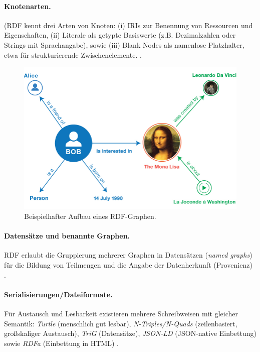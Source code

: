 \paragraph{Knotenarten.} (RDF kennt drei Arten von Knoten: (i) IRIs zur Benennung von Ressourcen und Eigenschaften, (ii) Literale als getypte Basiswerte (z.B. Dezimalzahlen oder Strings mit Sprachangabe), sowie (iii) Blank Nodes als namenlose Platzhalter, etwa für strukturierende Zwischenelemente. \cite{RDF11Primer}.

\begin{figure}[h]
\centering
\includegraphics[width=\linewidth]{Abbildungen/example-graph.jpg}
\caption{Beispielhafter Aufbau eines RDF-Graphen.}
\label{fig:example-rdf-graph}
\end{figure}


\paragraph{Datensätze und benannte Graphen.} RDF erlaubt die Gruppierung mehrerer Graphen in Datensätzen (\emph{named graphs}) für die Bildung von Teilmengen und die Angabe der Datenherkunft (Provenienz) \cite{RDF11Primer}.

\paragraph{Serialisierungen/Dateiformate.} Für Austausch und Lesbarkeit existieren mehrere Schreibweisen mit gleicher Semantik: \emph{Turtle} (menschlich gut lesbar), \emph{N-Triples/N-Quads} (zeilenbasiert, großskaliger Austausch), \emph{TriG} (Datensätze), \emph{JSON-LD} (JSON-native Einbettung) sowie \emph{RDFa} (Einbettung in HTML) \cite{RDF11Primer}.

